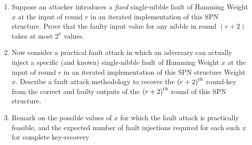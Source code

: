 \documentclass{article}
\begin{document}
\begin{questions}
\begin{enumerate}
 \item Suppose an attacker introduces a \emph{fixed} single-nibble fault of Hamming Weight $x$ at the input of round $r$ in an iterated implementation of this SPN structure. Prove that the faulty input value for any nibble in round $\left(r+2\right)$ takes at most $2^x$ values.
 
 \item Now consider a practical fault attack in which an adversary can actually inject a specific (and known) single-nibble fault of Hamming Weight $x$ at the input of round $r$ in an iterated implementation of this SPN structure Weight $x$. Describe a fault attack methodology to recover the $\left(r+2\right)^{\textnormal{th}}$ round-key from the correct and faulty outputs of the $\left(r+2\right)^{\textnormal{th}}$ round of this SPN structure. 
 
 \item Remark on the possible values of $x$ for which the fault attack is practically feasible, and the expected number of fault injections required for each such $x$ for complete key-recovery  
 
\end{enumerate}







\end{questions}
\end{document}

